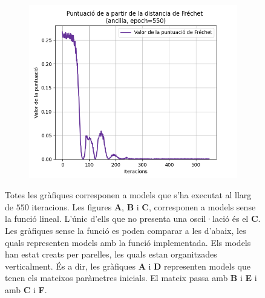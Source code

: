 \begin{figure}[H]
\begin{subfigure}[b]{.32\linewidth}
		\includegraphics[width=\linewidth]{figures/data/FD_score_A3.png}
		\caption{}
	\end{subfigure}
	\caption{Totes les gràfiques corresponen a models que s'ha executat al llarg de $550$ iteracions. Les figures \textbf{A}, \textbf{B} i \textbf{C}, corresponen a models sense la funció lineal. L'únic d'ells que no presenta una oscil·lació és el \textbf{C}. Les gràfiques sense la funció es poden comparar a les d'abaix, les quals representen models amb la funció implementada. Els models han estat creats per parelles, les quals estan organitzades verticalment. És a dir, les gràfiques \textbf{A} i \textbf{D} representen models que tenen els mateixos paràmetres inicials. El mateix passa amb \textbf{B} i \textbf{E} i amb \textbf{C} i \textbf{F}.}
\label{fig:550_SD_score}
\end{figure}

